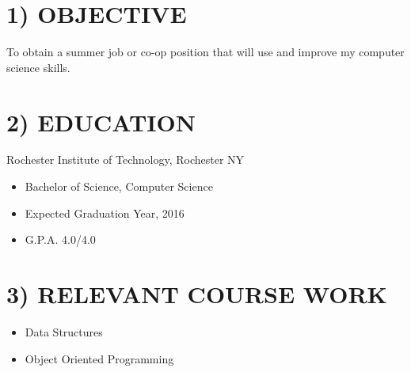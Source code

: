 \documentclass{res}
\begin{document}
                                 
\begin{resume}

\section{1) OBJECTIVE}          
    To obtain a summer job or co-op position that will use and improve my computer science skills.
 
\section{2) EDUCATION}          
	
	    Rochester Institute of Technology, Rochester NY
      \begin{itemize}
          \item Bachelor of Science, Computer Science
	        \item Expected Graduation Year, 2016
	        \item G.P.A. 4.0/4.0
      \end{itemize}
      \vspace{-.1in}

\section{3) RELEVANT COURSE WORK}
    \begin{itemize}
      \item Data Structures 
      \item Object Oriented Programming
    \end{itemize}

 

\end{resume}
\end{document}
